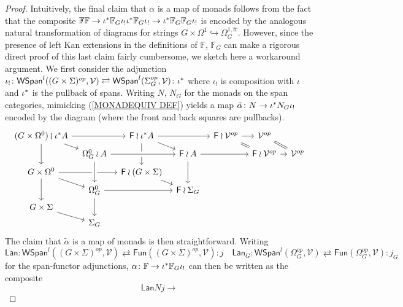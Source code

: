 \documentclass[a4paper,10pt]{article}%
\begin{document}
\begin{proof}
Intuitively, the final claim that 
$\alpha$ is a map of monads 
follows from the fact that the composite 
$
\mathbb{F} \mathbb{F}
	\to 
\iota^{\**} \mathbb{F}_G \iota_{!} \iota^{\**} \mathbb{F}_G \iota_{!}
	\to
\iota^{\**} \mathbb{F}_G \mathbb{F}_G \iota_{!}
$
is encoded by the analogous natural transformation of diagrams for strings $G \times \Omega^1 \hookrightarrow \Omega_{G}^{1,\text{fr}}$.
However, since the presence of left Kan extensions in the 
definitions of $\mathbb{F}$, $\mathbb{F}_G$
can make a rigorous direct proof of this last claim fairly cumbersome, we sketch here a workaround argument.
We first consider the adjunction
$
	\iota_{!} \colon
	\mathsf{WSpan}^l((G\times \Sigma)^{op},\mathcal{V})
		\rightleftarrows
	\mathsf{WSpan}^l(\Sigma_G^{op},\mathcal{V})
	\colon \iota^{\**}
$
where $\iota_!$ is composition with $\iota$ and $\iota^{\**}$ is the pullback of spans. 
Writing $N$, $N_G$ for the monads 
on the span categories, mimicking (\ref{MONADEQUIV DEF}) yields
a map 
$\tilde{\alpha} \colon N \to \iota^{\**} N_G \iota_{!}$
encoded by the diagram (where the front and back squares are pullbacks).
\[
\begin{tikzcd}[row sep=3pt, column sep =8pt]
	(G \times \Omega^0) \wr \iota^{\**} A	\ar{dd} \ar{rd} \ar{rr} &&
	\Fin \wr \iota^{\**} A \ar{rd} \ar{dd} \ar{rr}&&
	\Fin \wr \mathcal{V}^{op} \ar{r} \ar[equal]{rd} &
	\mathcal{V}^{op} \ar[equal]{rd}
\\
	& 
	|[alias=O1]|
	\Omega_{G}^{0} \wr A \ar[crossing over]{rr} &&
	\Fin \wr A \ar{dd} \ar{rr} &&
	\Fin \wr \mathcal{V}^{op} \ar{r} &
	\mathcal{V}^{op}
\\
	G \times \Omega^0	\ar{dd} \ar{rd} \ar{rr}&&
	\Fin \wr (G \times \Sigma) \ar{rd}
\\
	&
	|[alias=O2]|
	\Omega_{G}^{0} \ar{dd} \ar{rr} &&
	\Fin \wr \Sigma_G
\\
	G \times \Sigma \ar{rd}
\\
	& \Sigma_{G}
\arrow[from=O1, to=O2,crossing over]
\end{tikzcd}
\]
The claim that $\tilde{\alpha}$ is a map of monads is then straightforward. Writing
\[
	\mathsf{Lan} \colon
	\mathsf{WSpan}^l((G\times \Sigma)^{op},\mathcal{V})
		\rightleftarrows
	\mathsf{Fun}((G\times \Sigma)^{op},\mathcal{V})
	\colon j
\quad
	\mathsf{Lan}_G \colon
	\mathsf{WSpan}^l(\Omega_G^{op},\mathcal{V})
		\rightleftarrows
	\mathsf{Fun}(\Omega_G^{op},\mathcal{V})
	\colon j_G
\]
for the span-functor adjunctions,  
$\alpha \colon \mathbb{F} \to \iota^{\**} \mathbb{F}_G \iota_{!}$ can then be written as the composite
\[
	\mathsf{Lan} N j \to 
\]
\end{proof}
\end{document}
